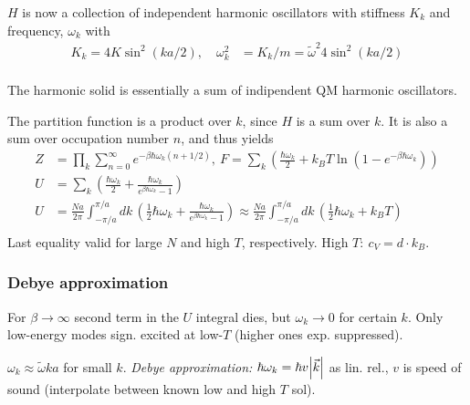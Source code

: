 \documentclass[a4paper, english, 12pt]{article}
\newcommand{\closed}[1]{\left( #1 \right)}
\begin{document}
\begin{multicols*}{2}
$H$ is now a collection of independent harmonic oscillators with stiffness $K_k$ and frequency, $\omega_k$ with 
\begin{align*}
    K_k = 4K \sin^2(ka/2),\quad \omega_k^2 &= K_k/m = \tilde{\omega}^2 4\sin^2(ka/2) \\
\end{align*}

The harmonic solid is essentially a sum of indipendent QM harmonic oscillators. 

The partition function is a product over $k$, since $H$ is a sum over $k$. It is also a sum over occupation number $n$, and thus yields 
\begin{align*}
    Z &= \prod_k \sum_{n=0}^\infty e^{-\beta \hbar \omega_k (n+1/2)},\: F= \sum_k \closed{\frac{\hbar \omega_k}{2} + k_B T \ln\closed{1-e^{-\beta \hbar \omega_k}} } \\
    U &= \sum_k \closed{\frac{\hbar \omega_k}{2} + \frac{\hbar \omega_k}{e^{\beta \hbar \omega_k} - 1} } \\ 
    U &= \frac{Na}{2\pi} \int_{-\pi/a}^{\pi/a} dk\, \closed{\frac{1}{2}\hbar \omega_k + \frac{\hbar \omega_k}{e^{\beta \hbar \omega_k} - 1} } \approx \frac{Na}{2\pi} \int_{-\pi/a}^{\pi/a} dk\, \closed{\frac{1}{2}\hbar \omega_k + k_B T} \\ 
\end{align*}
Last equality valid for large $N$ and high $T$, respectively. High $T:\:c_V=d\cdot k_B$.  

\subsubsection*{Debye approximation}
For $\beta\to\infty$ second term in the $U$ integral dies, but $\omega_k\to0$ for certain $k$. Only low-energy modes sign. excited at low-$T$ (higher ones exp. suppressed).  

$\omega_k\approx \tilde{\omega} ka$ for small $k$. \textit{Debye approximation:} $\hbar\omega_k=\hbar v \abs{\vec{k}}$ as lin. rel., $v$ is speed of sound (interpolate between known low and high $T$ sol).  


\end{multicols*}
\end{document}
